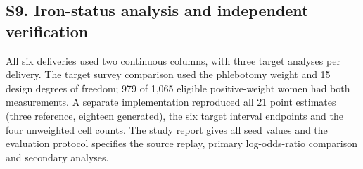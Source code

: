 \documentclass[sigconf,review]{acmart}
\begin{document}
\subsection*{S9. Iron-status analysis and independent verification}

All six deliveries used two continuous columns, with three target analyses per delivery. The target survey comparison used the phlebotomy weight and 15 design degrees of freedom; 979 of 1,065 eligible positive-weight women had both measurements. A separate implementation reproduced all 21 point estimates (three reference, eighteen generated), the six target interval endpoints and the four unweighted cell counts. The study report gives all seed values and the evaluation protocol specifies the source replay, primary log-odds-ratio comparison and secondary analyses.
\end{document}
